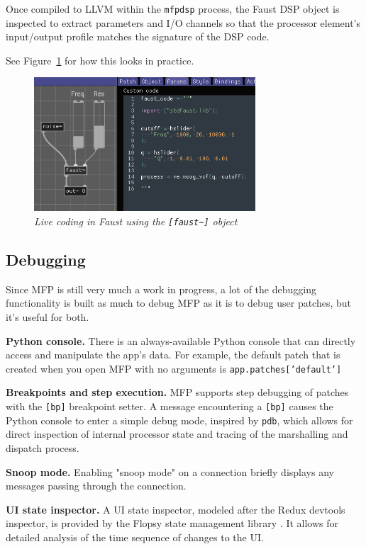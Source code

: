 \documentclass[a4paper]{article}
\def\:{\hskip0pt}
\begin{document}
Once compiled to LLVM within the {\tt mfpdsp} process, the Faust
DSP object is inspected to extract parameters and I/O channels so
that the processor element's input/output profile matches the
signature of the DSP code.

See Figure~\ref{fig:faustlivecoding} for how this looks in
practice.

\begin{figure}[ht]
\centerline{\includegraphics[width=3.25in]{faust_livecoding.png}}
\caption{\label{fig:faustlivecoding}{
    \it Live coding in Faust using the {\tt [faust\textasciitilde]} object
}}
\end{figure}


\subsection{Debugging}

Since MFP is still very much a work in progress, a lot of the
debugging functionality is built as much to debug MFP as it is to
debug user patches, but it's useful for both.

{\bf Python console.} There is an always\:-\:available Python console
that can directly access and manipulate the app's data.  For
example, the default patch that is created when you open MFP with
no arguments is {\tt app.patches['default']}

{\bf Breakpoints and step execution.} MFP supports step debugging
of patches with the {\tt [bp]} breakpoint setter. A message
encountering a {\tt [bp]} causes the Python console to enter a
simple debug mode, inspired by {\tt pdb}, which allows for direct
inspection of internal processor state and tracing of the
marshalling and dispatch process.

{\bf Snoop mode.} Enabling "snoop mode" on a connection briefly
displays any messages passing through the connection.

{\bf UI state inspector.} A UI state inspector, modeled after the
Redux devtools inspector, is provided by the Flopsy state
management library \cite{Gribble:Flopsy}. It allows for detailed
analysis of the time sequence of changes to the UI.
\end{document}
